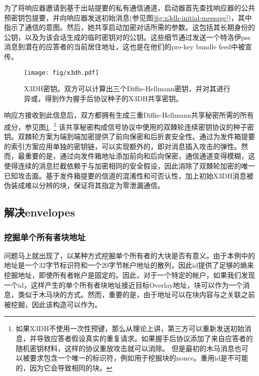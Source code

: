 为了将响应器邀请到基于出站提要的私有通信通道，启动器首先查找响应器的公共预密钥包提要，并向响应器发送初始消息(参见图\ref{fig:x3dh-initial-message})，其中指示了通信的意图。然后，她共享启动加密对话所需的参数。这包括其长期身份的公钥，以及为该会话生成的临时密钥对的公钥。这些细节通过发送一个特洛伊pss消息到潜在的应答者的当前居住地址，这也是在他们的pre-key bundle feed中被宣传。 

\begin{figure}[htbp]
   \centering
   \texttt{[image: fig/x3dh.pdf]}
   \caption[X3DH密钥\statusgreen]{X3DH密钥。双方可以计算出三个Diffie-Hellmann密钥，并对其进行异或，得到作为握手后协议种子的X3DH共享密钥。}
   \label{fig:x3dh}
\end{figure}

响应方接收到此信息后，双方都拥有生成三重Diffie-Hellmann共享秘密所需的所有成分，参见图\ref{fig:x3dh}.%
%
\footnote{如果X3DH不使用一次性预键，那么从理论上讲，第三方可以重新发送初始消息，并导致应答者假设真实的重复请求。如果握手后协议添加了来自应答者的随机密钥材料，这样的协议重放攻击就可以消除。
但是最初的木马消息也可以被要求包含一个唯一的标识符，例如用于挖掘块的nonce。重用id是不可能的，因为它会导致相同的块。}
%
该共享秘密构成信号协议中使用的双棘轮连续密钥协议的种子密钥。双棘轮方案为端到端加密提供了前向保密和后折衷安全性。通过为发件箱提要的索引方案应用单独的密钥链，可以实现额外的，即对消息插入攻击的弹性。然而，最重要的是，通过向发件箱地址添加前向和后向保密，通信通道变得模糊，这使得连续的消息拦截依赖于与加密相同的安全假设，因此消除了双棘轮加密的唯一已知攻击面。基于发件箱提要的信道的混淆性和可否认性，加上初始X3DH消息被伪装成难以分辨的块，保证将其指定为零泄漏通信。

\subsection{解决envelopes\statusgreen}\label{sec:addressed-envelopes}

\subsubsection{挖掘单个所有者块地址}

问题马上就出现了，以某种方式挖掘单个所有者的大块是否有意义。由于本例中的地址是一个32字节标识符和一个20字节帐户地址的散列，因此id提供了足够的熵来挖掘地址，即使所有者帐户是固定的。因此，对于一个特定的帐户，如果我们发现一个id，这样产生的单个所有者块地址接近目标Overlay地址，块可以作为一个消息，类似于木马块的方式。然而，重要的是，由于地址可以在块内容与之关联之前被挖掘，因此该构造可以作为。


